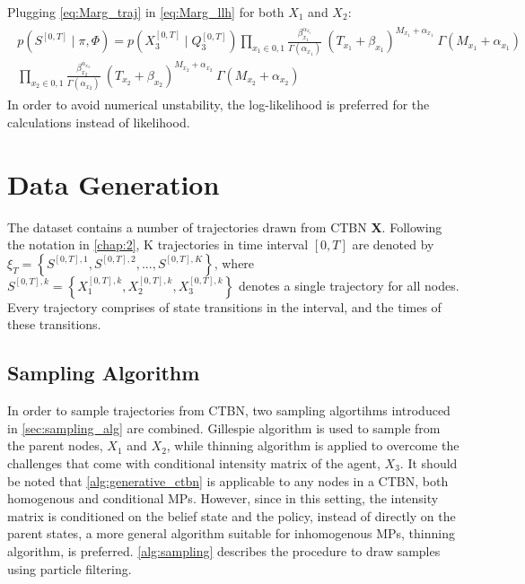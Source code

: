 Plugging \autoref{eq:Marg_traj} in \autoref{eq:Marg_llh} for both $ X_{1} $ and $ X_{2} $:
\begin{align}
\begin{split}
p(S^{[0,T]} \mid \pi, \Phi ) = p(X_{3}^{[0, T]}\mid Q_{3}^{[0, T]}) \prod_{x_{1}\in{0,1}} \frac{\beta_{x_{1}}^{\alpha_{x_{1}}}}{\Gamma(\alpha_{x_{1}})} \ (T_{x_{1}}+\beta_{x_{1}})^{M_{x_{1}} + \alpha_{x_{1}}}\ \Gamma(M_{x_{1}} + \alpha_{x_{1}})  \\  \prod_{x_{2}\in{0,1}} \frac{\beta_{x_{2}}^{\alpha_{x_{2}}}}{\Gamma(\alpha_{x_{2}})} \ (T_{x_{2}}+\beta_{x_{2}})^{M_{x_{2}} + \alpha_{x_{2}}}\ \Gamma(M_{x_{2}} + \alpha_{x_{2}})
\label{eq:Marg_llh_final}
\end{split}
\end{align}
In order to avoid numerical unstability, the log-likelihood is preferred for the calculations instead of likelihood.
\section{Data Generation}
The dataset contains a number of trajectories drawn from CTBN \textbf{X}. Following the notation in \cref{chap:2}, K trajectories in time interval $ [0, T] $ are denoted by $ \xi_T = \left\lbrace S^{[0,T], 1}, S^{[0,T], 2}, ..., S^{[0,T], K} \right\rbrace  $, where $ S^{[0,T],k} = \left\lbrace X_1^{[0,T],k} , X_2^{[0,T],k}, X_3^{[0,T],k}\right\rbrace $ denotes a single trajectory for all nodes. Every trajectory comprises of state transitions in the interval, and the times of these transitions. 

\subsection{Sampling Algorithm}
In order to sample trajectories from CTBN, two sampling algortihms introduced in \cref{sec:sampling_alg} are combined. Gillespie algorithm is used to sample from the parent nodes, $ X_1 $ and $ X_2 $, while thinning algorithm is applied to overcome the challenges that come with conditional intensity matrix of the agent, $ X_3 $. It should be noted that \cref{alg:generative_ctbn} is applicable to any nodes in a CTBN, both homogenous and conditional MPs. However, since in this setting, the intensity matrix is conditioned on the belief state and the policy, instead of directly on the parent states, a more general algorithm suitable for inhomogenous MPs, thinning algorithm, is preferred. \cref{alg:sampling} describes the procedure to draw samples using particle filtering. 

